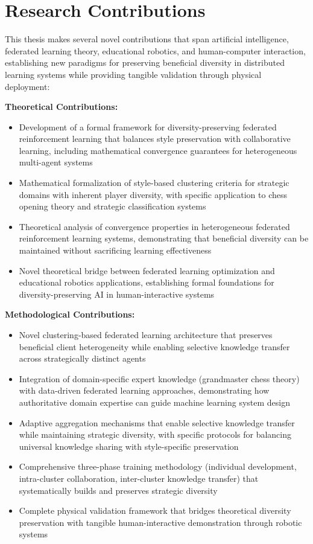 \section{Research Contributions}
\label{sec:contributions}

This thesis makes several novel contributions that span artificial intelligence, federated learning theory, educational robotics, and human-computer interaction, establishing new paradigms for preserving beneficial diversity in distributed learning systems while providing tangible validation through physical deployment:

\textbf{Theoretical Contributions:}
\begin{itemize}
\item Development of a formal framework for diversity-preserving federated reinforcement learning that balances style preservation with collaborative learning, including mathematical convergence guarantees for heterogeneous multi-agent systems
\item Mathematical formalization of style-based clustering criteria for strategic domains with inherent player diversity, with specific application to chess opening theory and strategic classification systems
\item Theoretical analysis of convergence properties in heterogeneous federated reinforcement learning systems, demonstrating that beneficial diversity can be maintained without sacrificing learning effectiveness
\item Novel theoretical bridge between federated learning optimization and educational robotics applications, establishing formal foundations for diversity-preserving AI in human-interactive systems
\end{itemize}

\textbf{Methodological Contributions:}
\begin{itemize}
\item Novel clustering-based federated learning architecture that preserves beneficial client heterogeneity while enabling selective knowledge transfer across strategically distinct agents
\item Integration of domain-specific expert knowledge (grandmaster chess theory) with data-driven federated learning approaches, demonstrating how authoritative domain expertise can guide machine learning system design
\item Adaptive aggregation mechanisms that enable selective knowledge transfer while maintaining strategic diversity, with specific protocols for balancing universal knowledge sharing with style-specific preservation
\item Comprehensive three-phase training methodology (individual development, intra-cluster collaboration, inter-cluster knowledge transfer) that systematically builds and preserves strategic diversity
\item Complete physical validation framework that bridges theoretical diversity preservation with tangible human-interactive demonstration through robotic systems
\end{itemize}

